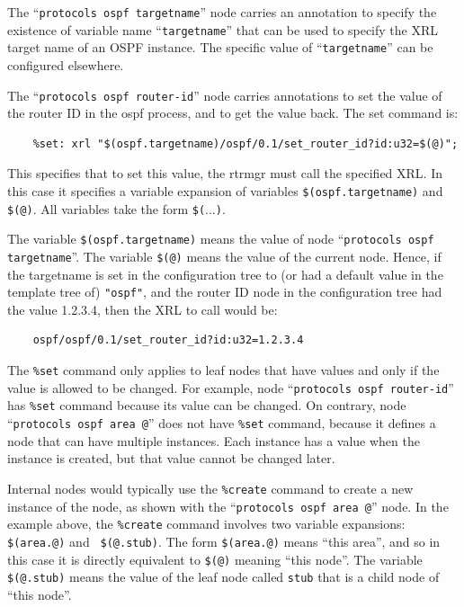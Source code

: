 \documentclass[11pt]{article}
\begin{document}
The ``{\tt protocols ospf targetname}'' node carries an annotation to
specify the existence of variable name ``{\tt targetname}'' that
can be used to specify the XRL target name of an OSPF instance.
The specific value of ``{\tt targetname}'' can be configured elsewhere.

The ``{\tt protocols ospf router-id}'' node carries annotations to set
the value of the router ID in the ospf process, and to get the value
back.  The set command is:

\begin{verbatim}
    %set: xrl "$(ospf.targetname)/ospf/0.1/set_router_id?id:u32=$(@)";
\end{verbatim}

This specifies that to set this value, the rtrmgr must call the
specified XRL.  In this case it specifies a variable expansion of
variables {\tt \$(ospf.targetname)} and  {\tt \$(@)}.  All variables take the
form {\tt \$(}...{\tt )}.

The variable {\tt \$(ospf.targetname)} means the value of node
``{\tt protocols ospf targetname}''.
The variable {\tt \$(@)} means the value of the current node.
Hence, if the targetname is set in the configuration tree to (or had a default
value in the template tree of) {\tt "ospf"}, and the router ID node in the
configuration tree had the value 1.2.3.4, then the XRL to call would be:

\begin{verbatim}
    ospf/ospf/0.1/set_router_id?id:u32=1.2.3.4
\end{verbatim}

The {\tt \%set} command only applies to leaf nodes that have values and only
if the value is allowed to be changed.
For example, node ``{\tt protocols ospf router-id}'' has {\tt \%set} command
because its value can be changed.
On contrary, node ``{\tt protocols ospf area @}'' does not have
{\tt \%set} command, because it defines a node that can have multiple
instances. Each instance has a value when the instance is created, but that
value cannot be changed later.

Internal nodes would typically use the {\tt \%create} command to
create a new instance of the node, as shown with the ``{\tt protocols ospf
area @}'' node.  In the example above, the {\tt \%create} command
involves two variable expansions: {\tt \$(area.@)} and {\tt
\$(@.stub)}.  The form {\tt \$(area.@)} means ``this area'', and so
in this case it is directly equivalent to {\tt \$(@)} meaning ``this node''.
The variable {\tt \$(@.stub)} means the value of the leaf node called
{\tt stub} that is a child node of ``this node''.
\end{document}
